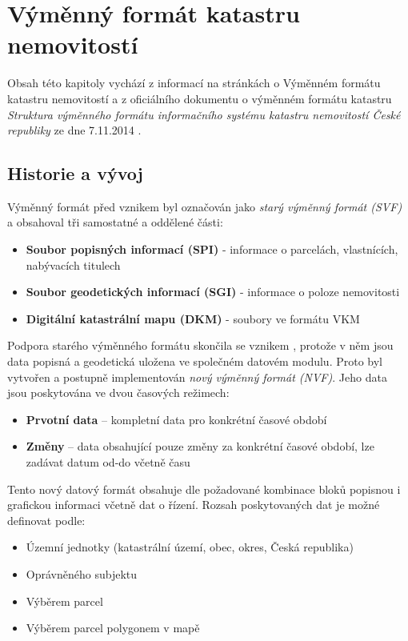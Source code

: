 \section{Výměnný formát katastru nemovitostí}
Obsah této kapitoly vychází z informací na stránkách  o
Výměnném formátu katastru nemovitostí a z oficiálního dokumentu o
výměnném formátu katastru \textit{Struktura výměnného formátu
  informačního systému katastru nemovitostí České republiky} ze dne
7.11.2014 \cite{struktura_ISKN}.
\subsection{Historie a vývoj}
Výměnný formát před vznikem  byl označován jako \textit{starý
  výměnný formát (SVF)} a obsahoval tři samostatné a oddělené části:
\begin{itemize}[leftmargin=50pt]
	\item \textbf{Soubor popisných informací (SPI)} - informace o parcelách, vlastnících, nabývacích titulech
	\item \textbf{Soubor geodetických informací (SGI)} - informace o poloze nemovitosti
	\item \textbf{Digitální katastrální mapu (DKM)} - soubory ve formátu VKM
\end{itemize}
Podpora starého výměnného formátu skončila se vznikem ,
protože v něm jsou data popisná a geodetická uložena ve společném
datovém modulu. Proto byl vytvořen a postupně implementován
\textit{nový výměnný formát (NVF)}. Jeho data jsou poskytována ve dvou
časových režimech:

\begin{itemize}[leftmargin=50pt]
\item \textbf{Prvotní data} -- kompletní data pro konkrétní časové období						
\item \textbf{Změny} -- data obsahující pouze změny za konkrétní časové období, lze zadávat datum od-do včetně času					 
\end{itemize}
Tento nový datový formát obsahuje dle požadované kombinace bloků
popisnou i grafickou informaci včetně dat o řízení. Rozsah
poskytovaných dat je možné definovat podle:

\begin{itemize}[leftmargin=50pt]
		\item Územní jednotky (katastrální území, obec, okres, Česká republika)
		\item Oprávněného subjektu
		\item Výběrem parcel
		\item Výběrem parcel polygonem v mapě
\end{itemize}
